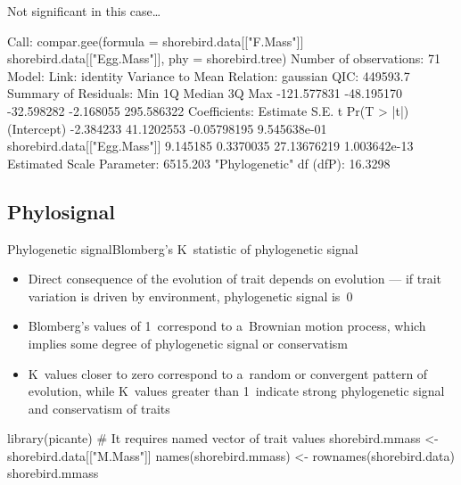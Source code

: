 \documentclass[compress, xelatex, 11pt, xcolor=svgnames, aspectratio=169, url={hyphens, lowtilde}]{beamer}
\begin{document}
\begin{frame}[fragile]{Not significant in this case\ldots}
	\begin{spluscode}
    Call: compar.gee(formula = shorebird.data[["F.Mass"]] ~
      shorebird.data[["Egg.Mass"]], phy = shorebird.tree)
    Number of observations:  71 
    Model:
                          Link: identity 
     Variance to Mean Relation: gaussian 
    QIC: 449593.7 
    Summary of Residuals:
            Min          1Q      Median          3Q         Max 
    -121.577831  -48.195170  -32.598282   -2.168055  295.586322 
    Coefficients:
                                  Estimate       S.E.           t  Pr(T > |t|)
    (Intercept)                  -2.384233 41.1202553 -0.05798195 9.545638e-01
    shorebird.data[["Egg.Mass"]]  9.145185  0.3370035 27.13676219 1.003642e-13
    Estimated Scale Parameter:  6515.203
    "Phylogenetic" df (dfP):  16.3298 
	\end{spluscode}
\end{frame}

%
%

\subsection{Phylosignal}

\begin{frame}[fragile]{Phylogenetic signal}{Blomberg's K~statistic of phylogenetic signal}
	\begin{itemize}
		\item Direct consequence of the evolution of trait depends on evolution --- if trait variation is driven by environment, phylogenetic signal is~0
		\item Blomberg's values of 1~correspond to a~Brownian motion process, which implies some degree of phylogenetic signal or conservatism
		\item K~values closer to zero correspond to a~random or convergent pattern of evolution, while K~values greater than 1~indicate strong phylogenetic signal and conservatism of traits
	\end{itemize}
	\begin{spluscode}
    library(picante)
    # It requires named vector of trait values
    shorebird.mmass <- shorebird.data[["M.Mass"]]
    names(shorebird.mmass) <- rownames(shorebird.data)
    shorebird.mmass
	\end{spluscode}
\end{frame}
\end{document}
